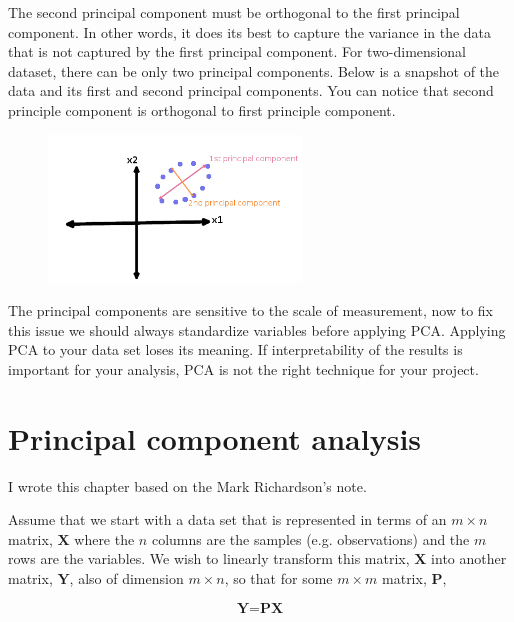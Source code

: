 \documentclass[12pt]{article}
\theoremstyle{plain}
\begin{document}
\begin{enumerate}
The second principal component must be orthogonal to the first principal component. In other words, it does its best to capture the variance in the data that is not captured by the first principal component. For two-dimensional dataset, there can be only two principal components. Below is a snapshot of the data and its first and second principal components. You can notice that second principle component is orthogonal to first principle component.

\begin{figure}[H]
 \begin{center}
  \includegraphics[width=0.6\textwidth]{media/PCA.png}

 \end{center}
\end{figure}

The principal components are sensitive to the scale of measurement, now to fix this issue we should always standardize variables before applying PCA. Applying PCA to your data set loses its meaning. If interpretability of the results is important for your analysis, PCA is not the right technique for your project.

\end{enumerate}

\section{Principal component analysis}
I wrote this chapter based on the Mark Richardson's note\cite{pca}.

Assume that we start with a data set that is represented in terms of an $m \times n$ matrix, $\textbf{X}$ where the $n$ columns are the samples (e.g. observations) and the $m$ rows are the variables. We wish to linearly transform this matrix,  $\textbf{X}$ into another matrix,  $\textbf{Y}$, also of dimension $m \times n$, so that for some $m \times m$ matrix, $\textbf{P}$,

\begin{equation}
\textbf{Y}=\textbf{PX}
\end{equation}
\end{document}
